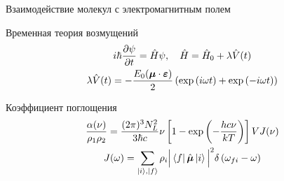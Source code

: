 \documentclass[10pt,usenames,pdf,hyperref={unicode},dvipsnames]{beamer}
\newcommand{\lb}{\left(}
\newcommand{\rb}{\right)}
\newcommand{\lsq}{\left[}
\newcommand{\rsq}{\right]}
\newcommand{\bmu}{\boldsymbol{\mu}}
\begin{document}
\begin{frame}{{\large Взаимодействие молекул с электромагнитным полем}}
    \vspace*{-0.3cm}
    \begin{block}{Временная теория возмущений}
    \vspace*{-0.5cm}
	\begin{gather}
		i \hbar \frac{\partial \psi}{\partial t} = \hat{H} \psi, \quad \hat{H} = \hat{H}_0 + \lambda \hat{V}(t) \notag \\
        \lambda \hat{V}(t) = - \frac{E_0 (\bmu \cdot \boldsymbol{\varepsilon})}{2} \lb \exp \lb i \omega t \rb + \exp \lb - i \omega t \rb \rb \notag
	\end{gather}
\end{block}

\begin{block}{Коэффициент поглощения}
    \vspace*{-0.5cm}
	\begin{gather}
		\frac{\alpha(\nu)}{\rho_1 \rho_2} = \frac{(2 \pi)^3 N_L^2}{3 \hbar c} \nu \lsq 1 - \exp \lb - \frac{h c \nu}{k T} \rb \rsq V J(\nu) \notag \\ 
		J(\omega) = \sum_{\ket{i}, \ket{f}} \rho_i \Big{|} \bra{f} \hat{\boldsymbol{\mu}} \ket{i} \Big{|}^2 \delta \lb \omega_{fi} - \omega \rb \notag 
	\end{gather}
\end{block}
\end{frame}
\end{document}
